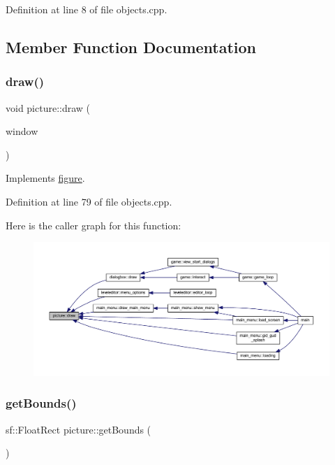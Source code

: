 Definition at line 8 of file objects.\+cpp.



\subsection{Member Function Documentation}
\mbox{\label{classpicture_ac69e8047651291091abbe2a8da545aa1}} 
\subsubsection{\texorpdfstring{draw()}{draw()}}
{\footnotesize\ttfamily void picture\+::draw (\begin{DoxyParamCaption}\item[{sf\+::\+Render\+Window \&}]{window }\end{DoxyParamCaption})\hspace{0.3cm}{\ttfamily [virtual]}}



Implements \hyperlink{classfigure_a56d8a53a8bf2b82178aa476bac071596}{figure}.



Definition at line 79 of file objects.\+cpp.

Here is the caller graph for this function\+:
\nopagebreak
\begin{figure}[H]
\begin{center}
\leavevmode
\includegraphics[width=350pt]{classpicture_ac69e8047651291091abbe2a8da545aa1_icgraph}
\end{center}
\end{figure}
\mbox{\label{classpicture_a3a23c2ae495660c218f6f4e40e7e61cc}} 
\subsubsection{\texorpdfstring{get\+Bounds()}{getBounds()}}
{\footnotesize\ttfamily sf\+::\+Float\+Rect picture\+::get\+Bounds (\begin{DoxyParamCaption}{ }\end{DoxyParamCaption})\hspace{0.3cm}{\ttfamily [virtual]}}



